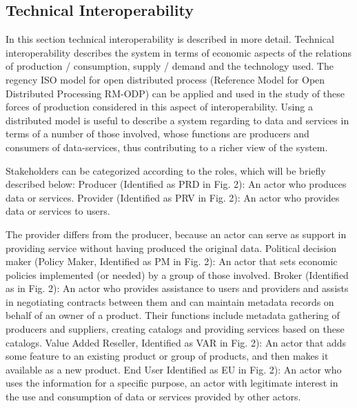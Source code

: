 \documentclass[10pt,twocolumn,ieeetran]{article}
\begin{document}
\subsection{Technical Interoperability}
In this section technical interoperability is described in more detail. Technical interoperability describes the system in terms of economic aspects of the relations of production / consumption, supply / demand and the technology used. The regency ISO model for open distributed process (Reference Model for Open Distributed Processing RM-ODP) can be applied and used in the study of these forces of production considered in this aspect of interoperability. Using a distributed model is useful to describe a system regarding to data and services in terms of a number of those involved, whose functions are producers and consumers of data-services, thus contributing to a richer view of the system.

Stakeholders can be categorized according to the roles, which will be briefly described below: Producer (Identified as PRD in Fig. 2): An actor who produces data or services. Provider (Identified as PRV in Fig. 2): An actor who provides data or services to users.

The provider differs from the producer, because an actor can serve as support in providing service without having produced the original data. Political decision maker (Policy Maker, Identified as PM in Fig. 2): An actor that sets economic policies implemented (or needed) by a group of those involved. Broker (Identified as in Fig. 2): An actor who provides assistance to users and providers and assists in negotiating contracts between them and can maintain metadata records on behalf of an owner of a product. Their functions include metadata gathering of producers and suppliers, creating catalogs and providing services based on these catalogs. Value Added Reseller, Identified as VAR in Fig. 2): An actor that adds some feature to an existing product or group of products, and then makes it available as a new product. End User Identified as EU in Fig. 2): An actor who uses the information for a specific purpose, an actor with legitimate interest in the use and consumption of data or services provided by other actors.


\end{document}

